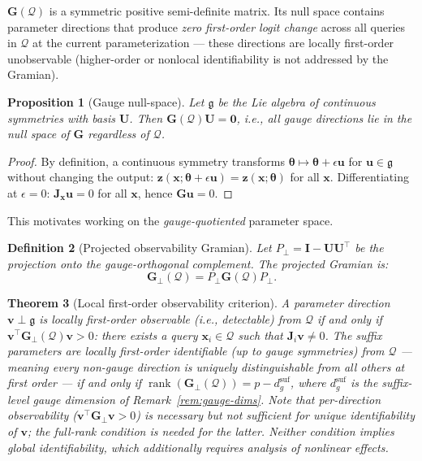 \documentclass{article}
\newtheorem{theorem}{Theorem}
\newtheorem{proposition}[theorem]{Proposition}
\newtheorem{definition}[theorem]{Definition}
\newcommand{\cQ}{\mathcal{Q}}
\newcommand{\btheta}{\boldsymbol{\theta}}
\newcommand{\bz}{\mathbf{z}}
\newcommand{\bx}{\mathbf{x}}
\newcommand{\bJ}{\mathbf{J}}
\newcommand{\bG}{\mathbf{G}}
\newcommand{\bU}{\mathbf{U}}
\newcommand{\bI}{\mathbf{I}}
\DeclareMathOperator{\rank}{rank}
\begin{document}
$\bG(\cQ)$ is a symmetric positive semi-definite matrix. Its null space contains parameter directions that produce \emph{zero first-order logit change} across all queries in $\cQ$ at the current parameterization --- these directions are locally first-order unobservable (higher-order or nonlocal identifiability is not addressed by the Gramian).

\begin{proposition}[Gauge null-space]
\label{prop:gauge-null}
Let $\mathfrak{g}$ be the Lie algebra of continuous symmetries with basis $\bU$. Then $\bG(\cQ)\bU = \mathbf{0}$, i.e., all gauge directions lie in the null space of $\bG$ regardless of $\cQ$.
\end{proposition}
\begin{proof}
By definition, a continuous symmetry transforms $\btheta \mapsto \btheta + \epsilon \mathbf{u}$ for $\mathbf{u} \in \mathfrak{g}$ without changing the output: $\bz(\bx; \btheta + \epsilon \mathbf{u}) = \bz(\bx; \btheta)$ for all $\bx$. Differentiating at $\epsilon = 0$: $\bJ_{\bx} \mathbf{u} = 0$ for all $\bx$, hence $\bG \mathbf{u} = 0$.
\end{proof}

This motivates working on the \emph{gauge-quotiented} parameter space.

\begin{definition}[Projected observability Gramian]
\label{def:proj-gramian}
Let $P_\perp = \bI - \bU\bU^\top$ be the projection onto the gauge-orthogonal complement. The projected Gramian is:
\begin{equation}\label{eq:proj-gramian}
 \bG_\perp(\cQ) = P_\perp \bG(\cQ) P_\perp.
\end{equation}
\end{definition}

\begin{theorem}[Local first-order observability criterion]
\label{thm:identifiability}
A parameter direction $\mathbf{v} \perp \mathfrak{g}$ is \emph{locally first-order observable} (i.e., detectable) from $\cQ$ if and only if $\mathbf{v}^\top \bG_\perp(\cQ) \mathbf{v} > 0$: there exists a query $\bx_i \in \cQ$ such that $\bJ_i \mathbf{v} \neq 0$. The suffix parameters are \emph{locally first-order identifiable} (up to gauge symmetries) from $\cQ$ --- meaning every non-gauge direction is uniquely distinguishable from all others at first order --- if and only if $\rank(\bG_\perp(\cQ)) = p - d_g^{\text{suf}}$, where $d_g^{\text{suf}}$ is the suffix-level gauge dimension of Remark~\ref{rem:gauge-dims}. Note that per-direction observability ($\mathbf{v}^\top \bG_\perp \mathbf{v} > 0$) is necessary but not sufficient for unique identifiability of $\mathbf{v}$; the full-rank condition is needed for the latter. Neither condition implies global identifiability, which additionally requires analysis of nonlinear effects.
\end{theorem}
\end{document}
